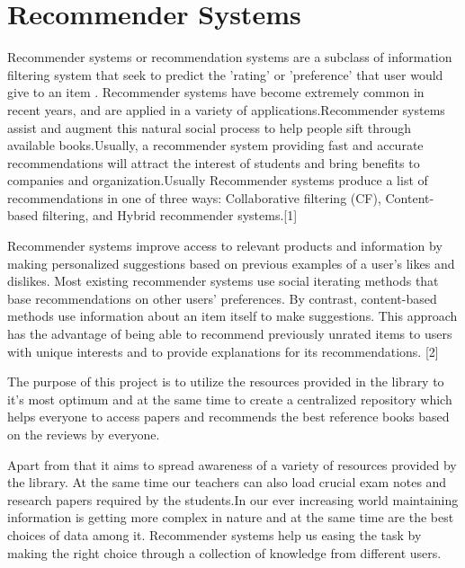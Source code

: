 \documentclass[a4paper,12pt]{report}
\begin{document}
\section{Recommender Systems}
\par Recommender systems or recommendation systems are a subclass of information filtering system that seek to predict the 'rating' or 'preference' that user would give to an item . Recommender systems have become extremely common in recent years, and are applied in a variety of applications.Recommender systems assist and augment this natural social process to help people sift through available books.Usually, a recommender system providing fast and accurate recommendations will attract the interest of students and bring benefits to companies and organization.Usually Recommender systems produce a list of recommendations in one of three ways: Collaborative filtering (CF), Content-based filtering, and Hybrid recommender systems.[1]\\

\par Recommender systems improve access to relevant products and information by making personalized suggestions based on previous examples of a user's likes and dislikes. Most existing recommender systems use social iterating methods that base recommendations on other users' preferences. By contrast, content-based methods use information about an item itself to make suggestions. This approach has the advantage of being able to recommend previously unrated items to users with unique interests and to provide explanations for its recommendations. [2]\\

\par The purpose of this project is to utilize the resources provided in the library to it’s most optimum and at the same time to create a centralized repository which helps everyone to access papers and recommends the best reference books based on the reviews by everyone.\\


\par Apart from that it aims to spread awareness of a variety of resources provided by the library. At the same time our teachers can also load crucial exam notes and research papers required by the students.In our ever increasing world maintaining information is getting more complex in nature and at the same time are the best choices of data among it. Recommender systems help us easing the task by making the right choice through a collection of knowledge from different users.\\
\end{document}
